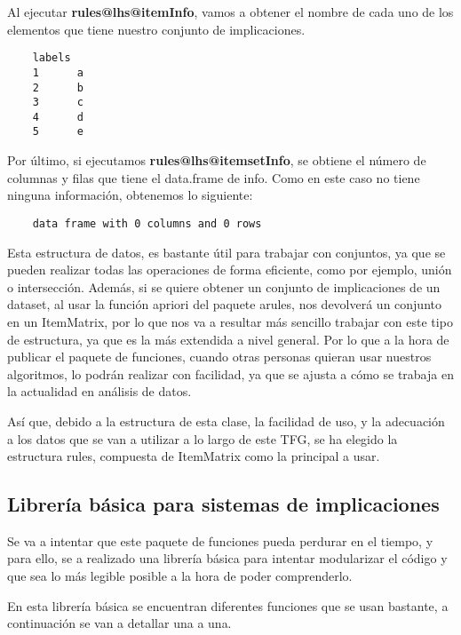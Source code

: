 Al ejecutar \textbf{rules@lhs@itemInfo}, vamos a obtener el nombre de cada uno de los elementos que 
tiene nuestro conjunto de implicaciones. 

\begin{verbatim}
    labels
    1      a
    2      b
    3      c
    4      d
    5      e
\end{verbatim}


Por \'ultimo, si ejecutamos \textbf{rules@lhs@itemsetInfo}, se obtiene el n\'umero de columnas y filas 
que tiene el data.frame de info. 
Como en este caso no tiene ninguna informaci\'on, obtenemos lo siguiente:
\begin{verbatim}
    data frame with 0 columns and 0 rows
\end{verbatim}


Esta estructura de datos, es bastante \'util para trabajar con conjuntos, ya que se pueden 
realizar todas las operaciones de forma eficiente, como por ejemplo, uni\'on o intersecci\'on.
Adem\'as, si se quiere obtener un conjunto de implicaciones de un dataset, al usar la funci\'on 
apriori del paquete arules, nos devolver\'a un conjunto en un ItemMatrix, por lo que nos va a 
resultar m\'as sencillo trabajar con este tipo de estructura, ya que es la m\'as 
extendida a nivel general. Por lo que a la hora de publicar el paquete de funciones, cuando otras 
personas quieran usar nuestros algoritmos, lo podr\'an realizar con facilidad, ya que se ajusta 
a c\'omo se trabaja en la actualidad en an\'alisis de datos.

As\'i que, debido a la estructura de esta clase, la facilidad de uso, y la adecuaci\'on a 
los datos que se van a utilizar a lo largo de este TFG, se ha elegido la estructura rules, compuesta de ItemMatrix 
como la principal a usar.


\clearpage








\subsection{Librer\'ia b\'asica para sistemas de implicaciones}
Se va a intentar que este paquete de funciones pueda perdurar en el tiempo, y para ello, 
se a realizado una librer\'ia b\'asica para intentar modularizar el c\'odigo y que sea lo 
m\'as legible posible a la hora de poder comprenderlo.

En esta librer\'ia b\'asica se encuentran diferentes funciones que se usan bastante, a continuaci\'on 
se van a detallar una a una.




